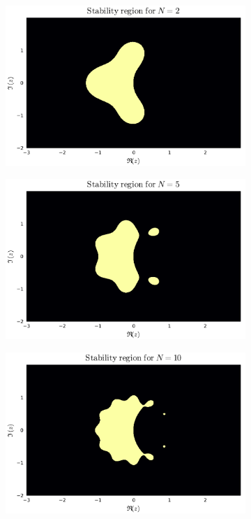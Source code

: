 \documentclass{article}
\begin{document}
\begin{figure}[H]
	\centering
	\begin{subfigure}{0.495\linewidth}
		\centering
		\includegraphics[width=\linewidth]{N2.pdf}
	\end{subfigure}
	\begin{subfigure}{0.495\linewidth}
		\centering
		\includegraphics[width=\linewidth]{N5.pdf}
	\end{subfigure}
	\begin{subfigure}{0.495\linewidth}
		\centering
		\includegraphics[width=\linewidth]{N10.pdf}

\end{subfigure}
\end{figure}
\end{document}
